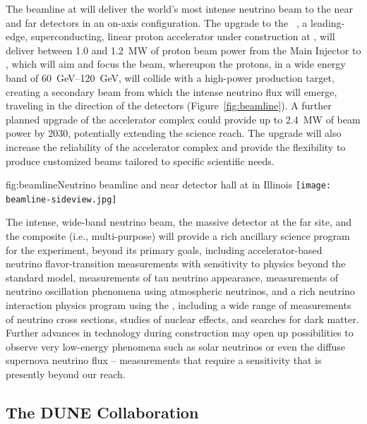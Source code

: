 The  
beamline at  will deliver the world's most intense neutrino beam to the near and far detectors in an on-axis configuration. 
The upgrade to the  ~\cite{pip2-2013}, a leading-edge, superconducting, linear proton accelerator under construction at , will deliver between \num{1.0} and \SI{1.2}{MW} of proton beam power from the  Main Injector to , which will aim and focus the beam, whereupon the protons,  in a wide energy band of \SIrange{60}{120}{\GeV}, will collide with a high-power production target, creating a secondary beam from which the intense neutrino flux will emerge, traveling in the direction of the  detectors (Figure~\ref{fig:beamline}).   A further planned upgrade 
of the accelerator complex could provide up to \SI{2.4}{\MW} of beam power by 2030, 
potentially extending the  science reach. The upgrade will also increase the reliability of the  accelerator complex and provide the flexibility to produce customized  beams tailored to specific scientific needs.

\begin{dunefigure}{fig:beamline}{Neutrino beamline and  near detector hall at  in Illinois}
\texttt{[image: beamline-sideview.jpg]}
\end{dunefigure}

The intense, wide-band neutrino beam, the massive  detector at the far site, and the composite (i.e., multi-purpose) 
 will provide a rich ancillary science program for the  experiment, beyond its primary goals,   
including accelerator-based neutrino flavor-transition measurements with sensitivity to physics beyond the standard model, measurements of tau neutrino appearance, measurements of neutrino oscillation phenomena using atmospheric neutrinos, and  a rich neutrino interaction physics program using the  , including a wide range of measurements of neutrino cross sections, studies of nuclear effects, and searches for dark matter. 
Further advances in  
technology during   construction may open up possibilities to observe very low-energy phenomena such as solar neutrinos or even the diffuse supernova neutrino flux -- measurements that require a sensitivity that is presently beyond our reach.

\subsection{The DUNE Collaboration}

